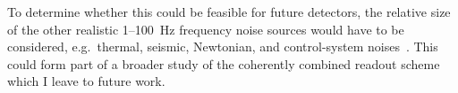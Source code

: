 To determine whether this could be feasible for future detectors, the relative size of the other realistic 1--100~Hz frequency noise sources would have to be considered, e.g.\ thermal, seismic, Newtonian, and control-system noises~\cite{}.
This could form part of a broader study of the coherently combined readout scheme which I leave to future work.


